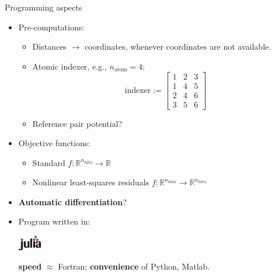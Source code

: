 \documentclass{beamer}
\begin{document}
\begin{frame}{Programming aspects}
\fontsize{8.5}{6}\selectfont
    \begin{itemize}
        \item Pre-computations:
        \begin{itemize}
            \fontsize{8.5}{10}\selectfont
            \item Distances $\to$ coordinates, whenever coordinates are not available.
            \item Atomic indexer, e.g., $n_\text{atom} = 4$:
            \begin{equation*}
                \text{indexer} := 
                \begin{bmatrix}
                    1 & 2 & 3\\
                    1 & 4 & 5\\
                    2 & 4 & 6\\
                    3 & 5 & 6
                \end{bmatrix}
            \end{equation*}  
            \item {\color{blue}Reference pair potential}?
        \end{itemize}
        \item Objective functions:
        \begin{itemize}
            \fontsize{8.5}{10}\selectfont
            \item Standard $f:\mathbb{R}^{n_\text{data}} \to \mathbb{R}$
            \item Nonlinear least-squares residuals $f:\mathbb{R}^{n_\text{data}} \to \mathbb{R}^{n_\text{data}}$
        \end{itemize}
        \item {\color{red} \textbf{Automatic differentiation}}?
        \item Program written in:
            \begin{center}
                \includegraphics[width = 1cm]{img/slide/Julia_Programming_Language_Logo.svg.png} \hspace*{7cm}
            \end{center}
            \textbf{speed} $\approx$ Fortran; \textbf{convenience} of Python, Matlab.
    \end{itemize}
\end{frame}
\end{document}
